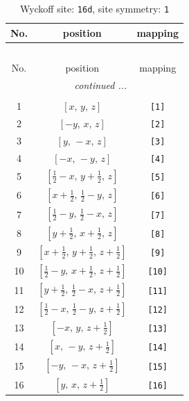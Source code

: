 \documentclass[fleqn,8pt]{jsarticle}
\begin{document}
\begin{longtable}{ccc}
\caption{Wyckoff site: {\tt 16d}, site symmetry: {\tt 1}}
 \\
 \hline \hline
No. & position & mapping \\ \hline \endfirsthead

\multicolumn{2}{l}{\tablename\ \thetable{}} \\
 \hline \hline
No. & position & mapping \\ \hline \endhead

 \hline \hline
\multicolumn{2}{r}{\footnotesize\it continued ...} \\ \endfoot

 \hline \hline
\multicolumn{2}{r}{} \\ \endlastfoot

1 & $\left[ x,\, y,\, z \right]$ & {\tt [1]} \\ \hline
2 & $\left[ - y,\, x,\, z \right]$ & {\tt [2]} \\ \hline
3 & $\left[ y,\, - x,\, z \right]$ & {\tt [3]} \\ \hline
4 & $\left[ - x,\, - y,\, z \right]$ & {\tt [4]} \\ \hline
5 & $\left[ \frac{1}{2} - x,\, y + \frac{1}{2},\, z \right]$ & {\tt [5]} \\ \hline
6 & $\left[ x + \frac{1}{2},\, \frac{1}{2} - y,\, z \right]$ & {\tt [6]} \\ \hline
7 & $\left[ \frac{1}{2} - y,\, \frac{1}{2} - x,\, z \right]$ & {\tt [7]} \\ \hline
8 & $\left[ y + \frac{1}{2},\, x + \frac{1}{2},\, z \right]$ & {\tt [8]} \\ \hline
9 & $\left[ x + \frac{1}{2},\, y + \frac{1}{2},\, z + \frac{1}{2} \right]$ & {\tt [9]} \\ \hline
10 & $\left[ \frac{1}{2} - y,\, x + \frac{1}{2},\, z + \frac{1}{2} \right]$ & {\tt [10]} \\ \hline
11 & $\left[ y + \frac{1}{2},\, \frac{1}{2} - x,\, z + \frac{1}{2} \right]$ & {\tt [11]} \\ \hline
12 & $\left[ \frac{1}{2} - x,\, \frac{1}{2} - y,\, z + \frac{1}{2} \right]$ & {\tt [12]} \\ \hline
13 & $\left[ - x,\, y,\, z + \frac{1}{2} \right]$ & {\tt [13]} \\ \hline
14 & $\left[ x,\, - y,\, z + \frac{1}{2} \right]$ & {\tt [14]} \\ \hline
15 & $\left[ - y,\, - x,\, z + \frac{1}{2} \right]$ & {\tt [15]} \\ \hline
16 & $\left[ y,\, x,\, z + \frac{1}{2} \right]$ & {\tt [16]} \\
\end{longtable}
\end{document}
